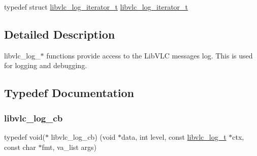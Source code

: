\begin{DoxyCompactItemize}
\item 
typedef struct \hyperlink{group__libvlc__log_ga5bc36e29d8021e6a8d06223ea2ce2262}{libvlc\+\_\+log\+\_\+iterator\+\_\+t} \hyperlink{group__libvlc__log_ga5bc36e29d8021e6a8d06223ea2ce2262}{libvlc\+\_\+log\+\_\+iterator\+\_\+t}
\end{DoxyCompactItemize}


\subsection{Detailed Description}
libvlc\+\_\+log\+\_\+$\ast$ functions provide access to the Lib\+V\+LC messages log. This is used for logging and debugging. 

\subsection{Typedef Documentation}
\mbox{\label{group__libvlc__log_ga2bc7c11ca559e643b90fc4d55f0c131c}} 
\subsubsection{\texorpdfstring{libvlc\+\_\+log\+\_\+cb}{libvlc\_log\_cb}}
{\footnotesize\ttfamily typedef void($\ast$ libvlc\+\_\+log\+\_\+cb) (void $\ast$data, int level, const \hyperlink{structvlc__log__t}{libvlc\+\_\+log\+\_\+t} $\ast$ctx, const char $\ast$fmt, va\+\_\+list args)}

